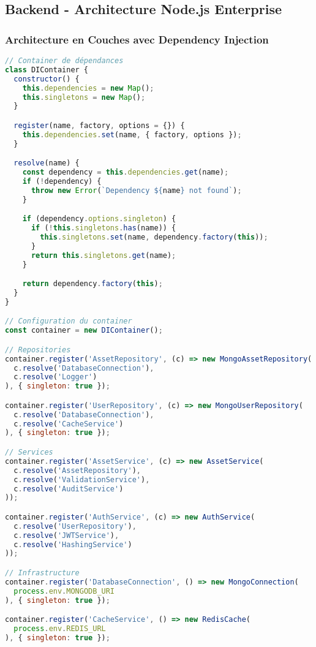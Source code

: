 \documentclass[12pt,a4paper]{report}
\begin{document}
\subsection{Backend - Architecture Node.js Enterprise}

\subsubsection{Architecture en Couches avec Dependency Injection}

\begin{lstlisting}[language=JavaScript, caption=Architecture backend avec DI]
// Container de dépendances
class DIContainer {
  constructor() {
    this.dependencies = new Map();
    this.singletons = new Map();
  }

  register(name, factory, options = {}) {
    this.dependencies.set(name, { factory, options });
  }

  resolve(name) {
    const dependency = this.dependencies.get(name);
    if (!dependency) {
      throw new Error(`Dependency ${name} not found`);
    }

    if (dependency.options.singleton) {
      if (!this.singletons.has(name)) {
        this.singletons.set(name, dependency.factory(this));
      }
      return this.singletons.get(name);
    }

    return dependency.factory(this);
  }
}

// Configuration du container
const container = new DIContainer();

// Repositories
container.register('AssetRepository', (c) => new MongoAssetRepository(
  c.resolve('DatabaseConnection'),
  c.resolve('Logger')
), { singleton: true });

container.register('UserRepository', (c) => new MongoUserRepository(
  c.resolve('DatabaseConnection'),
  c.resolve('CacheService')
), { singleton: true });

// Services
container.register('AssetService', (c) => new AssetService(
  c.resolve('AssetRepository'),
  c.resolve('ValidationService'),
  c.resolve('AuditService')
));

container.register('AuthService', (c) => new AuthService(
  c.resolve('UserRepository'),
  c.resolve('JWTService'),
  c.resolve('HashingService')
));

// Infrastructure
container.register('DatabaseConnection', () => new MongoConnection(
  process.env.MONGODB_URI
), { singleton: true });

container.register('CacheService', () => new RedisCache(
  process.env.REDIS_URL
), { singleton: true });


\end{lstlisting}
\end{document}
